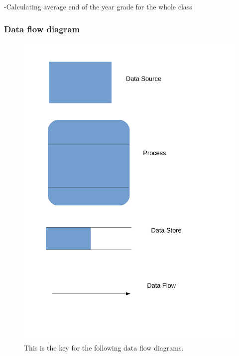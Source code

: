 \begin{algorithm}[H]
-Calculating average end of the year grade for the whole class



\subsubsection{Data flow diagram}

\begin{figure}[H]
    \includegraphics[width=\textwidth]{./Analysis/images/key.pdf}
    \caption{This is the key for the following data flow diagrams.} \label{fig:data_flow_diagram_key}
\end{figure}


\end{algorithm}
